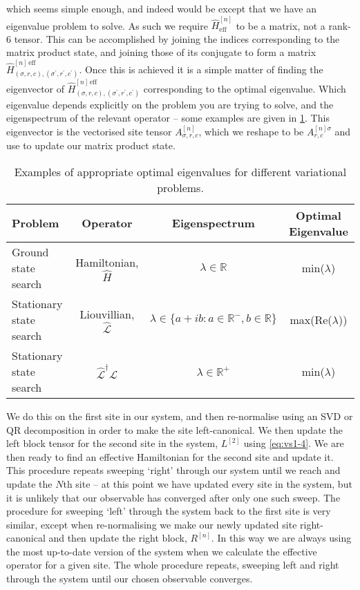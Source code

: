 which seems simple enough, and indeed would be except that we have an eigenvalue problem to solve. As such we require \(\hat{H}_{\mathrm{eff}}^{[n]}\) to be a matrix, not a rank-6 tensor. This can be accomplished by joining the indices corresponding to the matrix product state, and joining those of its conjugate to form a matrix \(\hat{H}^{[n]\, \mathrm{eff}}_{(\sigma ,r,c), (\sigma^{\prime},r^{\prime},c^{\prime})}\). Once this is achieved it is a simple matter of finding the eigenvector of \(\hat{H}^{[n]\, \mathrm{eff}}_{(\sigma ,r,c), (\sigma^{\prime},r^{\prime},c^{\prime})}\) corresponding to the optimal eigenvalue. Which eigenvalue depends explicitly on the problem you are trying to solve, and the eigenspectrum of the relevant operator -- some examples are given in \cref{tab:vs1-1}. This eigenvector is the vectorised site tensor \(A^{[n]}_{\sigma, r, c}\), which we reshape to be \(A^{[n] \sigma}_{r,c}\) and use to update our matrix product state.

\begin{table}[h!]
	\centering
	\begin{tabular}{l | c | c | c}
		Problem & Operator & Eigenspectrum & Optimal Eigenvalue \\ \hline
		Ground state search & Hamiltonian, \(\hat{H}\) & \(\lambda\in\mathbb{R}\) & min(\(\lambda\)) \\
		Stationary state search & Liouvillian, \(\hat{\mathcal{L}}\) & \(\lambda \in \{a + ib: a \in \mathbb{R}^{-}, b \in \mathbb{R}\}\) & max(Re(\(\lambda\))) \\
		Stationary state search & \(\hat{\mathcal{L}}^{\dagger}\hat{\mathcal{L}}\) & \(\lambda \in \mathbb{R}^{+}\) & min(\(\lambda\))  
	\end{tabular}
	\caption{Examples of appropriate optimal eigenvalues for different variational problems.}
	\label{tab:vs1-1}
\end{table}

We do this on the first site in our system, and then re-normalise using an SVD or QR decomposition in order to make the site left-canonical. We then update the left block tensor for the second site in the system, \(L^{[2]}\) using \cref{eq:vs1-4}. We are then ready to find an effective Hamiltonian for the second site and update it. This procedure repeats sweeping `right' through our system until we reach and update the \(N\)th site -- at this point we have updated every site in the system, but it is unlikely that our observable has converged after only one such sweep. The procedure for sweeping `left' through the system back to the first site is very similar, except when re-normalising we make our newly updated site right-canonical and then update the right block, \(R^{[n]}\). In this way we are always using the most up-to-date version of the system when we calculate the effective operator for a given site. The whole procedure repeats, sweeping left and right through the system until our chosen observable converges.

